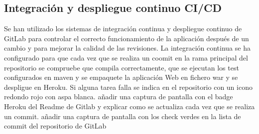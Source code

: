 \subsection{Integración y despliegue continuo CI/CD}
Se han utilizado los sistemas de integración continua y despliegue continuo de GitLab para controlar el correcto funcionamiento de la aplicación después de un cambio y para mejorar la calidad de las revisiones.
La integración continua se ha configurado para que cada vez que se realiza un coomit en la rama principal del repositorio se compruebe que compila correctamente, que se ejecutan los test configurados en maven y se empaquete la aplicación Web en fichero war y se despligue en Heroku. Si alguna tarea falla se indica en el repositorio con un icono redondo rojo con aspa blanca.
\todo añadir una captura de pantalla con el badge Heroku del  Readme de Gitlab y explicar como se actualiza cada vez que se realiza un commit. 
\todo añadir una captura de pantalla con los check verdes en la lista de commit del repositorio de GitLab
